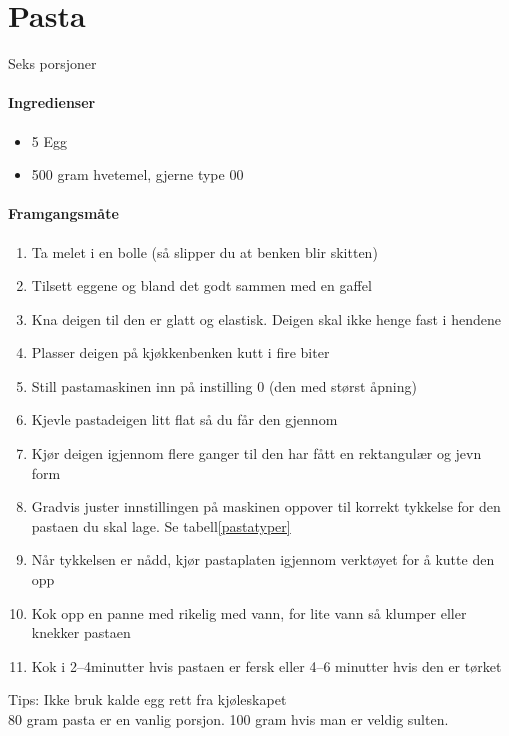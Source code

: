 \section{﻿Pasta}
Seks porsjoner

\paragraph{Ingredienser}
\begin{itemize}[noitemsep]
	\item 5 Egg
	\item 500 gram hvetemel, gjerne type 00
\end{itemize}

\paragraph{Framgangsmåte}
\begin{enumerate}[noitemsep]
	\item Ta melet i en bolle (så slipper du at benken blir skitten)
	\item Tilsett eggene og bland det godt sammen med en gaffel
	\item Kna deigen til den er glatt og elastisk. Deigen skal ikke henge fast i hendene
	\item Plasser deigen på kjøkkenbenken kutt i fire biter
	\item Still pastamaskinen inn på instilling 0 (den med størst åpning)
	\item Kjevle pastadeigen litt flat så du får den gjennom
	\item Kjør deigen igjennom flere ganger til den har fått en rektangulær og jevn form
	\item Gradvis juster innstillingen på maskinen oppover til korrekt tykkelse for den pastaen du skal lage. Se tabell\ref{pastatyper}
	\item Når tykkelsen er nådd, kjør pastaplaten igjennom verktøyet for å kutte den opp
	\item Kok opp en panne med rikelig med vann, for lite vann så klumper eller knekker pastaen
	\item Kok i 2--4minutter hvis pastaen er fersk eller 4--6 minutter hvis den er tørket
\end{enumerate}

Tips: Ikke bruk kalde egg rett fra kjøleskapet\\ %
			80 gram pasta er en vanlig porsjon. 100 gram hvis man er veldig sulten.\\

